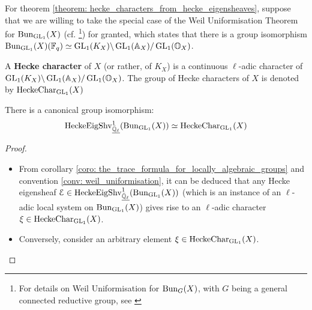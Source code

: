             \begin{convention} \label{conv: weil_uniformisation}
                For theorem \ref{theorem: hecke_characters_from_hecke_eigensheaves}, suppose that we are willing to take the special case of the Weil Uniformisation Theorem for $\mathrm{Bun}_{\operatorname{GL}_1}(X)$ (cf. \cite[Proposition 3.8]{tendler_2015_geometric_class_field_theory}\footnote{For details on Weil Uniformisation for $\mathrm{Bun}_G(X)$, with $G$ being a general connected reductive group, see \cite{sorger_BunG_uniformisation}}) for granted, which states that there is a group isomorphism $\mathrm{Bun}_{\operatorname{GL}_1}(X)(\mathbb{F}_q) \simeq \operatorname{GL}_1(K_X)\backslash\operatorname{GL}_1(\mathbb{A}_X)/\operatorname{GL}_1(\mathbb{O}_{X})$.
            \end{convention}
            \begin{definition} \label{def: hecke_characters}
                A \textbf{Hecke character} of $X$ (or rather, of $K_X$) is a continuous $\ell$-adic character of $\operatorname{GL}_1(K_X)\backslash\operatorname{GL}_1(\mathbb{A}_X)/\operatorname{GL}_1(\mathbb{O}_{X})$. The group of Hecke characters of $X$ is denoted by $\mathrm{Hecke}\mathrm{Char}_{\operatorname{GL}_1}(X)$
            \end{definition}
            \begin{theorem} \label{theorem: hecke_characters_from_hecke_eigensheaves}
                There is a canonical group isomorphism:
                    $$\mathrm{Hecke}\mathrm{Eig}\mathrm{Shv}_{\underline{\bar{\mathbb{Q}}_{\ell}}}^1(\mathrm{Bun}_{\operatorname{GL}_1}(X)) \simeq \mathrm{Hecke}\mathrm{Char}_{\operatorname{GL}_1}(X)$$
            \end{theorem}
                \begin{proof}
                    \noindent
                    \begin{itemize}
                        \item From corollary \ref{coro: the_trace_formula_for_locally_algebraic_groups} and convention \ref{conv: weil_uniformisation}, it can be deduced that any Hecke eigensheaf $\mathcal{E} \in \mathrm{Hecke}\mathrm{Eig}\mathrm{Shv}_{\underline{\bar{\mathbb{Q}}_{\ell}}}^1(\mathrm{Bun}_{\operatorname{GL}_1}(X))$ (which is an instance of an $\ell$-adic local system on $\mathrm{Bun}_{\operatorname{GL}_1}(X)$) gives rise to an $\ell$-adic character $\xi \in \mathrm{Hecke}\mathrm{Char}_{\operatorname{GL}_1}(X)$.
                        \item Conversely, consider an arbitrary element $\xi \in \mathrm{Hecke}\mathrm{Char}_{\operatorname{GL}_1}(X)$. 
                    \end{itemize}
                \end{proof}
            

